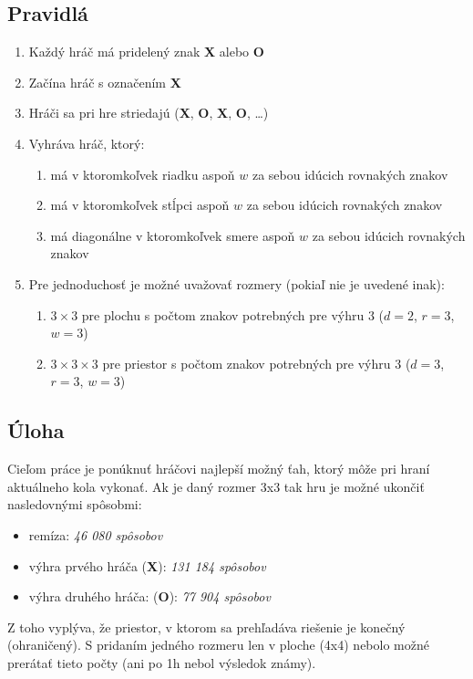 \subsection{Pravidlá}\label{subsec:rules}

\begin{enumerate}
    \item Každý hráč má pridelený znak \textbf{X} alebo \textbf{O}
    \item Začína hráč s označením \textbf{X}
    \item Hráči sa pri hre striedajú (\textbf{X}, \textbf{O}, \textbf{X}, \textbf{O}, \ldots)
    \item Vyhráva hráč, ktorý:
    \begin{enumerate}
        \item má v ktoromkoľvek riadku aspoň $w$ za sebou idúcich rovnakých znakov
        \item má v ktoromkoľvek stĺpci aspoň $w$ za sebou idúcich rovnakých znakov
        \item má diagonálne v ktoromkoľvek smere aspoň $w$ za sebou idúcich rovnakých znakov
    \end{enumerate}
    \item Pre jednoduchosť je možné uvažovať rozmery (pokiaľ nie je uvedené inak):
    \begin{enumerate}
        \item $3 \times 3$ pre plochu s počtom znakov potrebných pre výhru 3 ($d = 2$, $r = 3$, $w = 3$)
        \item $3 \times 3 \times 3$ pre priestor s počtom znakov potrebných pre výhru 3 ($d = 3$, $r = 3$, $w = 3$)
    \end{enumerate}
\end{enumerate}

\subsection{Úloha}\label{subsec:task}

Cieľom práce je ponúknuť hráčovi najlepší možný ťah, ktorý môže pri hraní aktuálneho kola vykonať.
Ak je daný rozmer 3x3 tak hru je možné ukončiť nasledovnými spôsobmi:\cite{number_of_wins}
\begin{itemize}
    \item remíza: \emph{46 080 spôsobov}
    \item výhra prvého hráča (\textbf{X}): \emph{131 184 spôsobov}
    \item výhra druhého hráča: (\textbf{O}): \emph{77 904 spôsobov}
\end{itemize}

Z toho vyplýva, že priestor, v ktorom sa prehľadáva riešenie je konečný (ohraničený).
S pridaním jedného rozmeru len v ploche (4x4) nebolo možné prerátať tieto počty (ani po 1h nebol výsledok známy).

